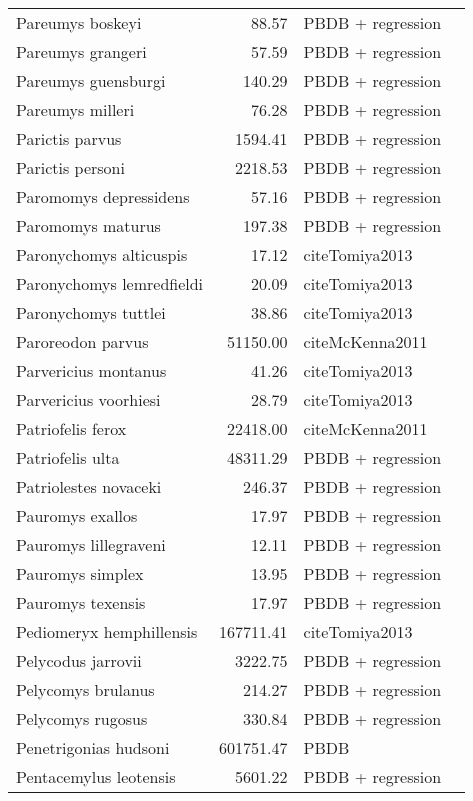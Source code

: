 \begin{table}[ht]
\begin{tabular}{lrll}
  Pareumys boskeyi & 88.57 & PBDB + regression &  \\ 
  Pareumys grangeri & 57.59 & PBDB + regression &  \\ 
  Pareumys guensburgi & 140.29 & PBDB + regression &  \\ 
  Pareumys milleri & 76.28 & PBDB + regression &  \\ 
  Parictis parvus & 1594.41 & PBDB + regression &  \\ 
  Parictis personi & 2218.53 & PBDB + regression &  \\ 
  Paromomys depressidens & 57.16 & PBDB + regression &  \\ 
  Paromomys maturus & 197.38 & PBDB + regression &  \\ 
  Paronychomys alticuspis & 17.12 & cite{Tomiya2013} &  \\ 
  Paronychomys lemredfieldi & 20.09 & cite{Tomiya2013} &  \\ 
  Paronychomys tuttlei & 38.86 & cite{Tomiya2013} &  \\ 
  Paroreodon parvus & 51150.00 & cite{McKenna2011} &  \\ 
  Parvericius montanus & 41.26 & cite{Tomiya2013} &  \\ 
  Parvericius voorhiesi & 28.79 & cite{Tomiya2013} &  \\ 
  Patriofelis ferox & 22418.00 & cite{McKenna2011} &  \\ 
  Patriofelis ulta & 48311.29 & PBDB + regression &  \\ 
  Patriolestes novaceki & 246.37 & PBDB + regression &  \\ 
  Pauromys exallos & 17.97 & PBDB + regression &  \\ 
  Pauromys lillegraveni & 12.11 & PBDB + regression &  \\ 
  Pauromys simplex & 13.95 & PBDB + regression &  \\ 
  Pauromys texensis & 17.97 & PBDB + regression &  \\ 
  Pediomeryx hemphillensis & 167711.41 & cite{Tomiya2013} &  \\ 
  Pelycodus jarrovii & 3222.75 & PBDB + regression &  \\ 
  Pelycomys brulanus & 214.27 & PBDB + regression &  \\ 
  Pelycomys rugosus & 330.84 & PBDB + regression &  \\ 
  Penetrigonias hudsoni & 601751.47 & PBDB &  \\ 
  Pentacemylus leotensis & 5601.22 & PBDB + regression &  \\ 

\end{tabular}
\end{table}
